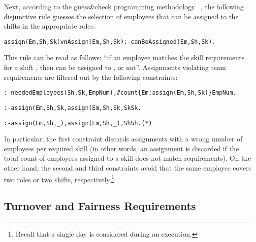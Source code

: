 \documentclass{tlp}
\begin{document}
Next, according to the guess\&check programming methodology
~\cite{eite-etal-2000c,leon-etal-2002-dlv}, the following disjunctive rule 
guesses the selection of employees that can be assigned to the shifts in the appropriate roles:
\begin{alltt}\small
 assign(Em,Sh,Sk) v nAssign(Em,Sh,Sk) :- canBeAssigned(Em,Sh,Sk).
\end{alltt}\normalsize
This rule can be read as follows: ``if an employee  matches the skill requirements for a shift , then
 can be assigned to , or not''.
Assignments violating team requirements are filtered out
by the following constraints:
\begin{alltt}\small
 :- neededEmployees(Sh,Sk,EmpNum), #count\{Em: assign(Em,Sh,Sk)\}  EmpNum.

 :- assign(Em,Sh,Sk, assign(Em,Sh,Sk, Sk  Sk.

 :- assign(Em,Sh,_), assign(Em,Sh,_), Sh  Sh. \hfill (*)
\end{alltt}\normalsize
In particular, the first constraint discards assignments with a wrong number of employees per required skill
(in other words, an assignment is discarded if the total count of employees assigned to a skill does not match requirements).
On the other hand, the second and third constraints avoid
that the same employee covers two roles or two shifts, respectively.\footnote{Recall that a single day is considered during an execution.}


\subsection{Turnover and Fairness Requirements}\label{subsec:turnover}
\end{document}
